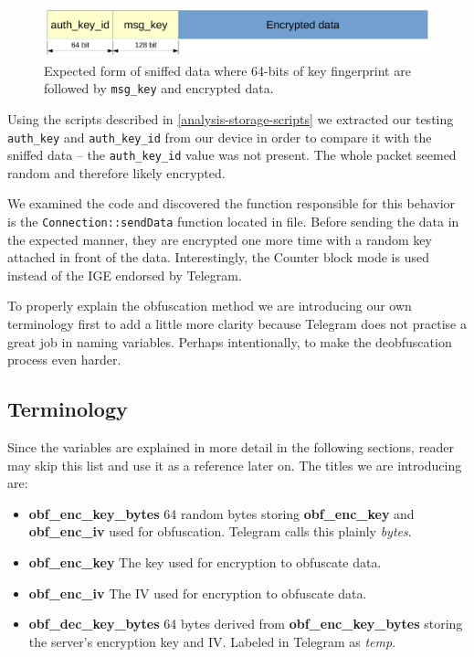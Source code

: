 \documentclass[thesis=M,english]{FITthesis}[2012/10/20]
\begin{document}
\begin{figure}[htb]
	\centering
	\includegraphics[width=1\textwidth]{sniffed-expected.pdf}
	\caption[Expected form of sniffed data]{Expected form of sniffed data where 64-bits of key fingerprint are followed by \texttt{msg\_key} and encrypted data.}
	\label{img:analysis-obf-expected}
\end{figure}

Using the scripts described in \ref{analysis-storage-scripts} we extracted our testing \texttt{auth\_key} and \texttt{auth\_key\_id} from our device in order to compare it with the sniffed data -- the \texttt{auth\_key\_id} value was not present. The whole packet seemed random and therefore likely encrypted.

We examined the code and discovered the function responsible for this behavior is the \texttt{Connection::sendData} function located in  file. Before sending the data in the expected manner, they are encrypted one more time with a random key attached in front of the data. Interestingly, the Counter block mode is used instead of the IGE endorsed by Telegram.

To properly explain the obfuscation method we are introducing our own terminology first to add a little more clarity because Telegram does not practise a great job in naming variables. Perhaps intentionally, to make the deobfuscation process even harder.

\subsection{Terminology}

Since the variables are explained in more detail in the following sections, reader may skip this list and use it as a reference later on. The titles we are introducing are:

\begin{itemize}
	\item \textbf{obf\_enc\_key\_bytes} 64 random bytes storing \textbf{obf\_enc\_key} and \textbf{obf\_enc\_iv} used for obfuscation. Telegram calls this plainly \emph{bytes}.
	\item \textbf{obf\_enc\_key} The key used for encryption to obfuscate data.
	\item \textbf{obf\_enc\_iv} The IV used for encryption to obfuscate data.
	\item \textbf{obf\_dec\_key\_bytes} 64 bytes derived from \textbf{obf\_enc\_key\_bytes} storing the server's encryption key and IV. Labeled in Telegram as \emph{temp}.
\end{itemize}
\end{document}

